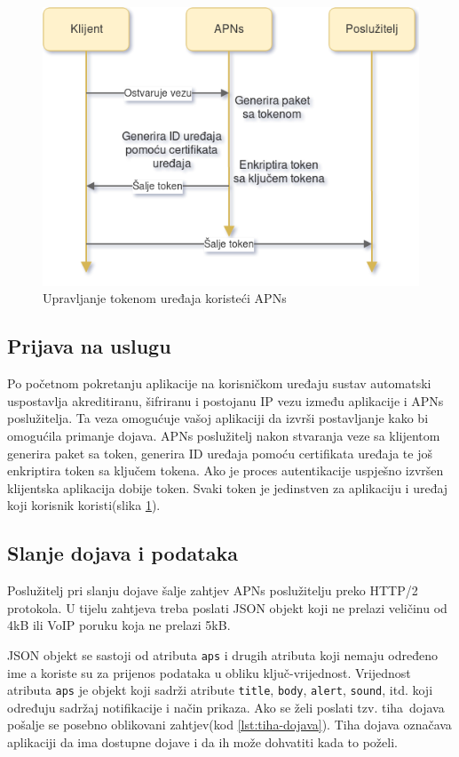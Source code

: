 \documentclass[times, utf8, zavrsni]{fer}
\begin{document}
{\begin{figure}[htb]
\centering
\includegraphics[width=\linewidth]{img/apns.png}
\caption{Upravljanje tokenom uređaja koristeći APNs}
\label{fig:apns-image}
\end{figure}

\subsection{Prijava na uslugu}
Po početnom pokretanju aplikacije na korisničkom uređaju sustav automatski uspostavlja akreditiranu, šifriranu i postojanu IP vezu između aplikacije i APNs poslužitelja. Ta veza omogućuje vašoj aplikaciji da izvrši postavljanje kako bi omogućila primanje dojava. APNs poslužitelj nakon stvaranja veze sa klijentom generira paket sa token, generira ID uređaja pomoću certifikata uređaja te još enkriptira token sa ključem tokena. Ako je proces autentikacije uspješno izvršen klijentska aplikacija dobije token. Svaki token je jedinstven za aplikaciju i uređaj koji korisnik koristi(slika \ref{fig:apns-image}).

\subsection{Slanje dojava i podataka}
Poslužitelj pri slanju dojave šalje zahtjev APNs poslužitelju preko HTTP/2 protokola. U tijelu zahtjeva treba poslati JSON objekt koji ne prelazi veličinu od 4kB ili 	VoIP poruku koja ne prelazi 5kB.

JSON objekt se sastoji od atributa {\tt aps} i drugih atributa koji nemaju određeno ime a koriste su za prijenos podataka u obliku ključ-vrijednost. Vrijednost atributa {\tt aps} je objekt koji sadrži atribute {\tt title}, {\tt body}, {\tt alert}, {\tt sound}, itd. koji određuju sadržaj notifikacije i način prikaza. Ako se želi poslati tzv. \glqq tiha\grqq\  dojava pošalje se posebno oblikovani zahtjev(kod \ref{lst:tiha-dojava}). Tiha dojava označava aplikaciji da ima dostupne dojave i da ih može dohvatiti kada to poželi.\citep{apns2017}

}
\end{document}
